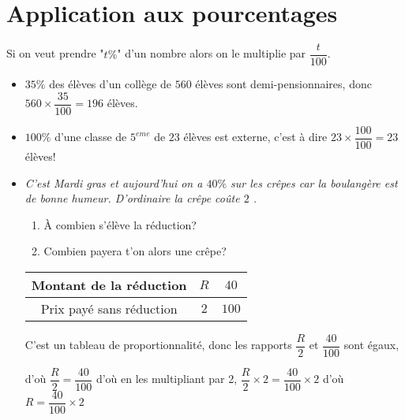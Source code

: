 \section{Application aux pourcentages}
\begin{propriete}[\admise]
   Si on veut prendre "$t\%$" d'un nombre alors on le multiplie par $\dfrac{t}{100}$.
\end{propriete}

\begin{exemple*1}
   \begin{itemize}
      \item $35\%$ des élèves d'un collège de $560$ élèves sont demi-pensionnaires, donc $560\times \dfrac{35}{100}=196$ élèves.
      \item $100 \%$ d'une classe de $5^{eme}$ de $23$ élèves est externe, c'est à dire $23\times \dfrac{100}{100}= 23$ élèves!
      \item \textit{C'est Mardi gras et aujourd'hui on a $40\%$ sur les crêpes car la boulangère est de bonne humeur. D'ordinaire la crêpe coûte $2$ \Prix{}.}
      \begin{enumerate}
         \item \`{A} combien s'élève la réduction?
         \item Combien payera t'on alors une crêpe?
      \end{enumerate}

      \smallskip
      \begin{tabular}{|c|c|c|}
         \hline
         Montant de la réduction&$R$&$40$ \Prix{}\\
         \hline
         Prix payé sans réduction&$2$ \Prix{}&$100$ \Prix{}\\
         \hline
      \end{tabular}

      \smallskip
      C'est un tableau de proportionnalité, donc les rapports $\dfrac{R}{2}$ et $\dfrac{40}{100}$ sont égaux,

      d'où $\dfrac{R}{2}=\dfrac{40}{100}$ d'où en les multipliant par 2, $\dfrac{R}{2} \times 2=\dfrac{40}{100} \times 2$ d'où $R=\dfrac{40}{100} \times 2$
   \end{itemize}
\end{exemple*1}

